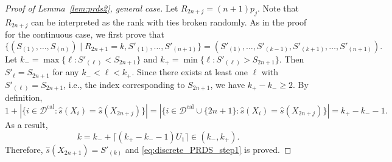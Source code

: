 \begin{proof}[Proof of Lemma~\ref{lem:prds2}, general case]
Let $R_{2n+j} = (n + 1)p_j$. Note that $R_{2n+j}$ can be interpreted as the rank with ties broken randomly. As in the proof for the continuous case, we first prove that
\begin{equation}\label{eq:discrete_PRDS_step1}
\bigg\{(S_{(1)}, \ldots, S_{(n)})\mid R_{2n+1} = k, S'_{(1)}, \ldots, S'_{(n+1)}\bigg\} = (S'_{(1)}, \ldots, S'_{(k-1)}, S'_{(k+1)}, \ldots, S'_{(n+1)}).
\end{equation}
Let $k_{-} = \max\{\ell: S'_{(\ell)} < S_{2n+1}\}$ and $k_{+} = \min\{\ell: S'_{(\ell)} > S_{2n+1}\}$. Then $S'_{\ell} = S_{2n+1}$ for any $k_{-} < \ell < k_{+}$. Since there exists at least one $\ell$ with $S'_{(\ell)} = S_{2n+1}$, i.e., the index corresponding to $S_{2n+1}$, we have $k_{+} - k_{-}\ge 2$. By definition,
\[1 + |\{i \in \mathcal{D}^{\text{cal}} : \hat{s}(X_i) = \hat{s}(X_{2n+j})\}| = |\{i \in \mathcal{D}^{\text{cal}}\cup \{2n+1\} : \hat{s}(X_i) = \hat{s}(X_{2n+j})\}| = k_{+} - k_{-} - 1.\]
As a result,
\[k = k_{-} + \lceil (k_{+} - k_{-} - 1)U_{1}\rceil\in (k_{-}, k_{+}).\]
Therefore, $\hat{s}(X_{2n+1}) = S'_{(k)}$ and \eqref{eq:discrete_PRDS_step1} is proved.


\end{proof}
